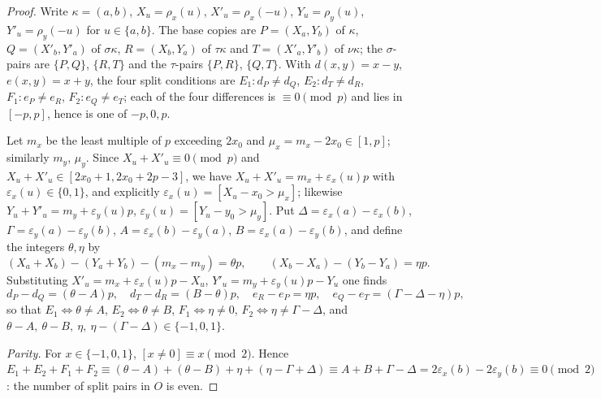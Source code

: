 \documentclass[11pt]{article}
\theoremstyle{remark}
\begin{document}
\begin{proof}
Write $\kappa=(a,b)$, $X_u=\rho_x(u)$, $X'_u=\rho_x(-u)$, $Y_u=\rho_y(u)$, $Y'_u=\rho_y(-u)$ for $u\in\{a,b\}$.  The base copies
are $P=(X_a,Y_b)$ of $\kappa$, $Q=(X'_b,Y'_a)$ of $\sigma\kappa$, $R=(X_b,Y_a)$ of $\tau\kappa$ and $T=(X'_a,Y'_b)$ of $\nu\kappa$;
the $\sigma$-pairs are $\{P,Q\}$, $\{R,T\}$ and the $\tau$-pairs $\{P,R\}$, $\{Q,T\}$.  With $d(x,y)=x-y$, $e(x,y)=x+y$, the four
split conditions are $E_1: d_P\ne d_Q$, $E_2: d_T\ne d_R$, $F_1: e_P\ne e_R$, $F_2: e_Q\ne e_T$; each of the four differences is
$\equiv0\pmod p$ and lies in $[-p,p]$, hence is one of $-p,0,p$.

Let $m_x$ be the least multiple of $p$ exceeding $2x_0$ and $\mu_x=m_x-2x_0\in[1,p]$; similarly $m_y$, $\mu_y$.  Since
$X_u+X'_u\equiv0\pmod p$ and $X_u+X'_u\in[2x_0+1,2x_0+2p-3]$, we have $X_u+X'_u=m_x+\varepsilon_x(u)p$ with
$\varepsilon_x(u)\in\{0,1\}$, and explicitly $\varepsilon_x(u)=[X_u-x_0>\mu_x]$; likewise $Y_u+Y'_u=m_y+\varepsilon_y(u)p$,
$\varepsilon_y(u)=[Y_u-y_0>\mu_y]$.  Put $\Delta=\varepsilon_x(a)-\varepsilon_x(b)$, $\Gamma=\varepsilon_y(a)-\varepsilon_y(b)$,
$A=\varepsilon_x(b)-\varepsilon_y(a)$, $B=\varepsilon_x(a)-\varepsilon_y(b)$, and define the integers $\theta,\eta$ by
\[
 (X_a+X_b)-(Y_a+Y_b)-(m_x-m_y)=\theta p,\qquad (X_b-X_a)-(Y_b-Y_a)=\eta p .
\]
Substituting $X'_u=m_x+\varepsilon_x(u)p-X_u$, $Y'_u=m_y+\varepsilon_y(u)p-Y_u$ one finds
\[
 d_P-d_Q=(\theta-A)p,\quad d_T-d_R=(B-\theta)p,\quad e_R-e_P=\eta p,\quad e_Q-e_T=(\Gamma-\Delta-\eta)p,
\]
so that $E_1\Leftrightarrow\theta\ne A$, $E_2\Leftrightarrow\theta\ne B$, $F_1\Leftrightarrow\eta\ne0$,
$F_2\Leftrightarrow\eta\ne\Gamma-\Delta$, and $\theta-A,\ \theta-B,\ \eta,\ \eta-(\Gamma-\Delta)\in\{-1,0,1\}$.

\emph{Parity.}  For $x\in\{-1,0,1\}$, $[x\ne0]\equiv x\pmod2$.  Hence
$E_1+E_2+F_1+F_2\equiv(\theta-A)+(\theta-B)+\eta+(\eta-\Gamma+\Delta)\equiv A+B+\Gamma-\Delta=2\varepsilon_x(b)-2\varepsilon_y(b)
\equiv0\pmod2$: the number of split pairs in $O$ is even.


\end{proof}
\end{document}
